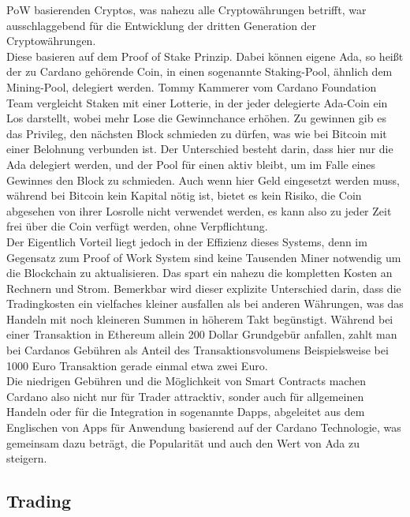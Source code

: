 \documentclass[12pt]{article}
\begin{document}
PoW basierenden Cryptos, was nahezu alle Cryptowährungen betrifft, war ausschlaggebend für die Entwicklung der dritten Generation der Cryptowährungen.\\
		Diese basieren auf dem Proof of Stake Prinzip. Dabei können eigene Ada, so heißt der zu Cardano gehörende Coin, in einen sogenannte Staking-Pool, ähnlich dem Mining-Pool, delegiert werden. Tommy Kammerer vom Cardano Foundation Team vergleicht Staken mit einer Lotterie, in der jeder delegierte Ada-Coin ein Los darstellt, wobei mehr Lose die Gewinnchance erhöhen. Zu gewinnen gib es das Privileg, den nächsten Block schmieden zu dürfen, was wie bei Bitcoin mit einer Belohnung verbunden ist. Der Unterschied besteht darin, dass hier nur die Ada delegiert werden, und der Pool für einen aktiv bleibt, um im Falle eines Gewinnes den Block zu schmieden. Auch wenn hier Geld eingesetzt werden muss, während bei Bitcoin kein Kapital nötig ist, bietet es kein Risiko, die Coin abgesehen von ihrer Losrolle nicht verwendet werden, es kann also zu jeder Zeit frei über die Coin verfügt werden, ohne Verpflichtung.\\
		Der Eigentlich Vorteil liegt jedoch in der Effizienz dieses Systems, denn im Gegensatz zum Proof of Work System sind keine Tausenden Miner notwendig um die Blockchain zu aktualisieren. Das spart ein nahezu die kompletten Kosten an Rechnern und Strom. Bemerkbar wird dieser explizite Unterschied darin, dass die Tradingkosten ein vielfaches kleiner ausfallen als bei anderen Währungen, was das Handeln mit noch kleineren Summen in höherem Takt begünstigt. Während bei einer Transaktion in Ethereum allein 200 Dollar Grundgebür anfallen, zahlt man bei Cardanos Gebühren als Anteil des Transaktionsvolumens Beispielsweise bei 1000 Euro Transaktion gerade einmal etwa zwei Euro.\\
		Die niedrigen Gebühren und die Möglichkeit von Smart Contracts machen Cardano also nicht nur für Trader attracktiv, sonder auch für allgemeinen Handeln oder für die Integration in sogenannte Dapps, abgeleitet aus dem Englischen von Apps für Anwendung basierend auf der Cardano Technologie, was gemeinsam dazu beträgt, die Popularität und auch den Wert von Ada zu steigern.

\subsection{Trading}
\end{document}
